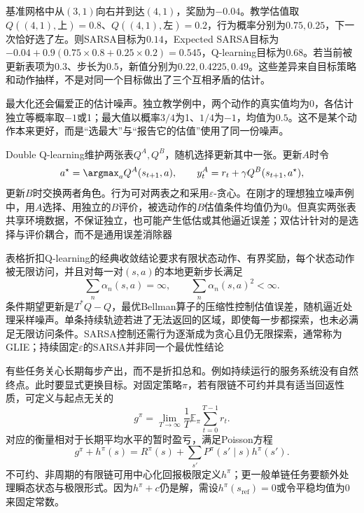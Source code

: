 \begin{example}
  \label{ex:rl-learning-sarsa-q}
  基准网格中从$(3,1)$向右并到达$(4,1)$，奖励为$-0.04$。教学估值取$Q((4,1),\text{上})=0.8$、$Q((4,1),\text{左})=0.2$，行为概率分别为$0.75,0.25$，下一次恰好选了左。则SARSA目标为$0.14$，Expected SARSA目标为$-0.04+0.9(0.75\times0.8+0.25\times0.2)=0.545$，Q-learning目标为$0.68$。若当前被更新表项为$0.3$、步长为$0.5$，新值分别为$0.22,0.4225,0.49$。这些差异来自目标策略和动作抽样，不是对同一个目标做出了三个互相矛盾的估计。
\end{example}

最大化还会偏爱正的估计噪声。独立教学例中，两个动作的真实值均为0，各估计独立等概率取$-1$或1；最大值以概率$3/4$为1、$1/4$为$-1$，均值为$0.5$。这不是某个动作本来更好，而是“选最大”与“报告它的估值”使用了同一份噪声。

Double Q-learning维护两张表$Q^A,Q^B$，随机选择更新其中一张。更新$A$时令
\begin{equation}
  a^\star=\argmax_a Q^A(s_{t+1},a),\qquad
  y_t^A=r_t+\gamma Q^B(s_{t+1},a^\star),
  \label{eq:rl-learning-double-q}
\end{equation}
更新$B$时交换两者角色。行为可对两表之和采用$\varepsilon$-贪心。在刚才的理想独立噪声例中，用$A$选择、用独立的$B$评价，被选动作的$B$估值条件均值仍为0。但真实两张表共享环境数据，不保证独立，也可能产生低估或其他逼近误差；双估计针对的是选择与评价耦合，而不是通用误差消除器

表格折扣Q-learning的经典收敛结论要求有限状态动作、有界奖励，每个状态动作被无限访问，并且对每一对$(s,a)$的本地更新步长满足
\[
  \sum_n\alpha_n(s,a)=\infty,\qquad
  \sum_n\alpha_n(s,a)^2<\infty .
\]
条件期望更新是$T^*Q-Q$，最优Bellman算子的压缩性控制估值误差，随机逼近处理采样噪声。单条持续轨迹若进了无法返回的区域，即使每一步都探索，也未必满足无限访问条件。SARSA控制还需行为逐渐成为贪心且仍无限探索，通常称为GLIE；持续固定$\varepsilon$的SARSA并非同一个最优性结论

有些任务关心长期每步产出，而不是折扣总和。例如持续运行的服务系统没有自然终点。此时要显式更换目标。对固定策略$\pi$，若有限链不可约并具有适当回返性质，可定义与起点无关的
\[
  g^\pi=\lim_{T\to\infty}\frac1T
      \mathbb E_\pi\sum_{t=0}^{T-1}r_t .
\]
对应的衡量相对于长期平均水平的暂时盈亏，满足Poisson方程
\begin{equation}
  g^\pi+h^\pi(s)=R^\pi(s)+\sum_{s'}P^\pi(s'\mid s)h^\pi(s').
  \label{eq:rl-learning-average-poisson}
\end{equation}
不可约、非周期的有限链可用中心化回报极限定义$h^\pi$；更一般单链任务要额外处理瞬态状态与极限形式。因为$h^\pi+c$仍是解，需设$h^\pi(s_{\mathrm{ref}})=0$或令平稳均值为0来固定常数。

